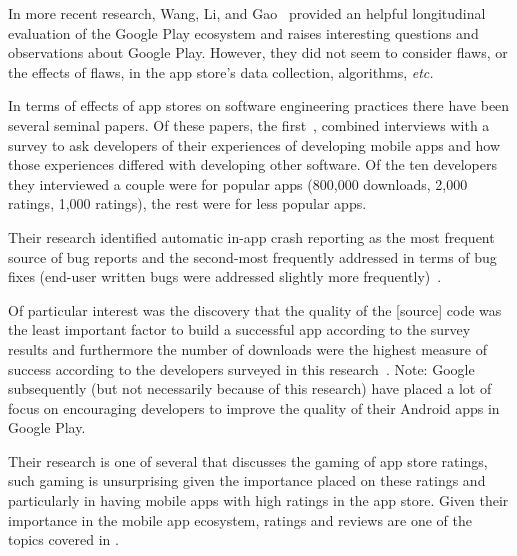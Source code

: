 In more recent research, Wang, Li, and Gao~ provided an helpful longitudinal evaluation of the Google Play ecosystem and raises interesting questions and observations about Google Play. However, they did not seem to consider flaws, or the effects of flaws, in the app store's data collection, algorithms,\emph{ etc.}

In terms of effects of app stores on software engineering practices there have been several seminal papers. %
%
Of these papers, the first~, combined interviews with a survey to ask developers of their experiences of developing mobile apps and how those experiences differed with developing other software.
%
Of the ten developers they interviewed a couple were for popular apps (800,000 downloads, 2,000 ratings, 1,000 ratings), the rest were for less popular apps. %

Their research identified automatic in-app crash reporting as the most frequent source of bug reports and the second-most frequently addressed in terms of bug fixes (end-user written bugs were addressed slightly more frequently)~. 

Of particular interest was the discovery that the quality of the [source] code was the least important factor to build a successful app according to the survey results and furthermore the number of downloads were the highest measure of success according to the developers surveyed in this research~. Note: Google subsequently (but not necessarily because of this research) have placed a lot of focus on encouraging developers to improve the quality of their Android apps in Google Play. 

Their research is one of several that discusses the gaming of app store ratings, such gaming is unsurprising given the importance placed on these ratings and particularly in having mobile apps with high ratings in the app store. Given their importance in the mobile app ecosystem, ratings and reviews are one of the topics covered in .

